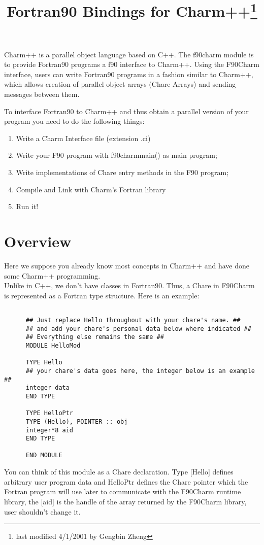 \documentclass[11pt]{article}
\title{Fortran90 Bindings for Charm++\footnote{last modified 4/1/2001 by Gengbin Zheng}}
\begin{document}
\maketitle

Charm++ is a parallel object language based on C++. The f90charm module is to
provide Fortran90 programs a f90 interface to Charm++. Using the F90Charm interface,
users can write Fortran90 programs in a fashion similar to Charm++, which allows
creation of parallel object arrays (Chare Arrays) and sending messages between 
them.

To interface Fortran90 to Charm++ and thus obtain a parallel version of your 
program you need to do the following things:
\begin{enumerate}
\item Write a Charm Interface file (extension .ci)
\item Write your F90 program with f90charmmain() as main program;
\item Write implementations of Chare entry methods in the F90 program;
\item Compile and Link with Charm's Fortran library
\item Run it!
\end{enumerate}

\section{Overview}

Here we suppose you already know most concepts in Charm++ and have done some 
Charm++ programming. \\
Unlike in C++, we don't have classes in Fortran90. Thus, a Chare in F90Charm is 
represented as a Fortran type structure. Here is an example:

\begin{verbatim}

      ## Just replace Hello throughout with your chare's name. ##
      ## and add your chare's personal data below where indicated ##
      ## Everything else remains the same ##
      MODULE HelloMod

      TYPE Hello
      ## your chare's data goes here, the integer below is an example ##
      integer data
      END TYPE

      TYPE HelloPtr
      TYPE (Hello), POINTER :: obj
      integer*8 aid
      END TYPE

      END MODULE
\end{verbatim}
You can think of this module as a Chare declaration. Type [Hello] defines 
arbitrary user program data and HelloPtr defines the Chare pointer which the
Fortran program will use later to communicate with the F90Charm runtime 
library, the [aid] is the handle of the array returned by the F90Charm library, user 
shouldn't change it.
\end{document}
